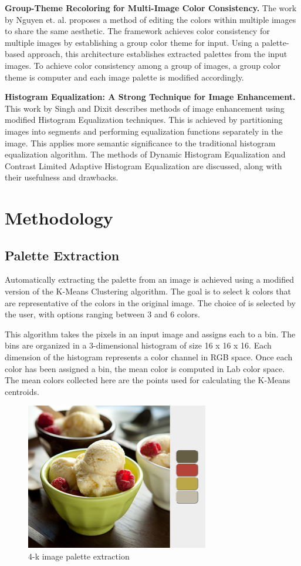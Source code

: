 \documentclass[sigchi]{acmart}
\begin{document}
\noindent\textbf{Group-Theme Recoloring for Multi-Image Color Consistency.} The work by Nguyen et. al. proposes a method of editing the colors within multiple images to share the same aesthetic. The framework achieves color consistency for multiple images by establishing a group color theme for input. Using a palette-based approach, this architecture establishes extracted palettes from the input images. To achieve color consistency among a group of images, a group color theme is computer and each image palette is modified accordingly.
\linebreak

\noindent\textbf{Histogram Equalization: A Strong Technique for Image Enhancement.} This work by Singh and Dixit describes methods of image enhancement using modified Histogram Equalization techniques. This is achieved by partitioning images into segments and performing equalization functions separately in the image. This applies more semantic significance to the traditional histogram equalization algorithm. The methods of Dynamic Histogram Equalization and Contrast Limited Adaptive Histogram Equalization are discussed, along with their usefulness and drawbacks.

\section{Methodology}

\subsection{Palette Extraction}

Automatically extracting the palette from an image is achieved using a modified version of the K-Means Clustering algorithm. The goal is to select k colors that are representative of the colors in the original image. The choice of  is selected by the user, with options ranging between 3 and 6 colors.

This algorithm takes the pixels in an input image and assigns each to a bin. The bins are organized in a 3-dimensional histogram of size 16 x 16 x 16. Each dimension of the histogram represents a color channel in RGB space. Once each color has been assigned a bin, the mean color is computed in Lab color space. The mean colors collected here are the points used for calculating the K-Means centroids.

\begin{figure}[t]
	\includegraphics[width=8cm]{IceFigure}
	\caption{4-k image palette extraction}
\end{figure}
\end{document}
